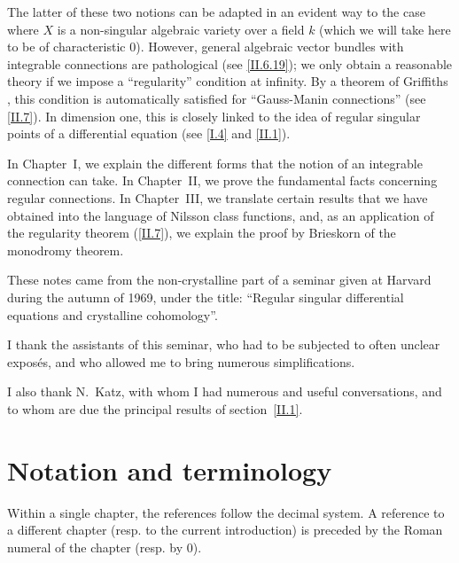 \documentclass{report}
\theoremstyle{plain}
\theoremstyle{definition}
\newcommand{\oldpage}[1]{\marginpar{\footnotesize$\Big\vert$ \textit{p.~#1}}}
\begin{document}
The latter of these two notions can be adapted in an evident way to the case where $X$ is a non-singular algebraic variety over a field $k$ (which we will take here to be of characteristic $0$).
However, general algebraic vector bundles with integrable connections are pathological (see \cref{II.6.19});
we only obtain a reasonable theory if we impose a ``regularity'' condition at infinity.
By a theorem of Griffiths \cite{8}, this condition is automatically satisfied for ``Gauss-Manin connections'' (see \cref{II.7}).
In dimension one, this is closely linked to the idea of regular singular points of a differential equation (see \cref{I.4} and \cref{II.1}).

In Chapter~I, we explain the different forms that the notion of an integrable connection can take.
In Chapter~II, we prove the fundamental facts concerning regular connections.
In Chapter~III, we translate certain results that we have obtained into the language of Nilsson class functions, and, as an application of the regularity theorem (\cref{II.7}), we explain the proof by Brieskorn \cite{5} of the monodromy theorem.

These notes came from the non-crystalline part of a seminar given at Harvard during the autumn of 1969, under the title: ``Regular singular differential equations and crystalline cohomology''.

I thank the assistants of this seminar, who had to be subjected to often unclear expos\'{e}s, and who allowed me to bring numerous simplifications.

I also thank N.~Katz, with whom I had numerous and useful conversations, and to whom are due the principal results of section~\cref{II.1}.


\section*{Notation and terminology}

\oldpage{2}
Within a single chapter, the references follow the decimal system.
A reference to a different chapter (resp. to the current introduction) is preceded by the Roman numeral of the chapter (resp. by 0).
\end{document}
